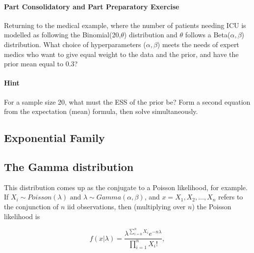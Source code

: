 \documentclass{article}
\begin{document}
\begin{Exercise}
    \paragraph{Part Consolidatory and Part Preparatory Exercise}
    Returning to the medical example, where the number of patients needing ICU is modelled as following the Binomial(20,$\theta$) distribution and $\theta$ follows a Beta($\alpha,\beta$) distribution. What choice of hyperparameters ($\alpha,\beta$) meets the needs of expert medics who want to give equal weight to the data and the prior, and have the prior mean equal to $0.3$?
    \paragraph{Hint}
    For a sample size 20, what must the ESS of the prior be?
    Form a second equation from the expectation (mean) formula, then solve simultaneously.
\end{Exercise}

\subsection{Exponential Family}

\subsection{The Gamma distribution}
This distribution comes up as the conjugate to a Poisson likelihood, for example. If $X_i \sim Poisson(\lambda) \text{ \ and \ } \lambda \sim Gamma(\alpha,\beta)$, and $x=X_1, X_2, ..., X_n$ refers to the conjunction of $n$ iid observations, then (multiplying over $n$) the Poisson likelihood is

\begin{equation}
    f(x|\lambda)=\frac{\lambda^{\sum_{i=0}^n X_i}e^{-n\lambda}}  {\prod_{i=1}^n X_i!},
\end{equation}
\end{document}
